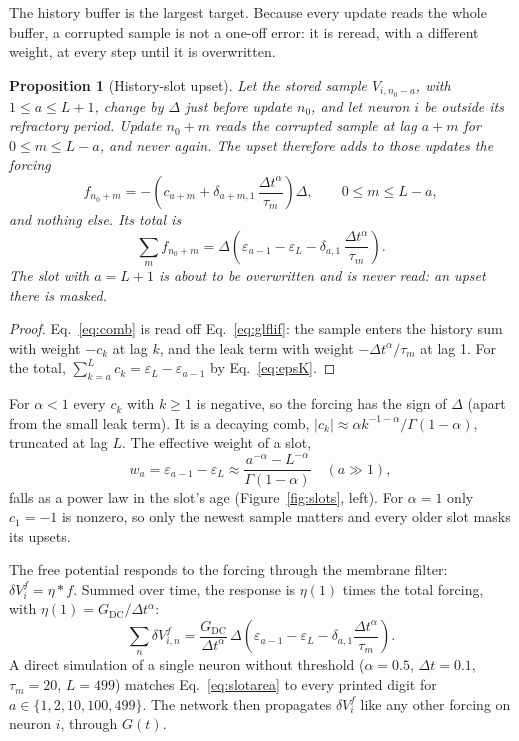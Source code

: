\documentclass[11pt,a4paper]{article}
\newcommand{\dta}{\Delta t^{\alpha}}
\newtheorem{proposition}{Proposition}
\begin{document}
The history buffer is the largest target. Because every update reads the whole buffer, a corrupted sample is not a one-off error: it is reread, with a different weight, at every step until it is overwritten.

\begin{proposition}[History-slot upset]
\label{prop:slot}
Let the stored sample $V_{i,n_0-a}$, with $1 \le a \le L+1$, change by $\Delta$ just before update $n_0$, and let neuron $i$ be outside its refractory period. Update $n_0+m$ reads the corrupted sample at lag $a+m$ for $0 \le m \le L-a$, and never again. The upset therefore adds to those updates the forcing
\begin{equation}
f_{n_0+m} = -\left( c_{a+m} + \delta_{a+m,1}\, \frac{\dta}{\tau_m} \right) \Delta, \qquad 0 \le m \le L-a,
\label{eq:comb}
\end{equation}
and nothing else. Its total is
\begin{equation}
\sum_m f_{n_0+m} = \Delta \left( \varepsilon_{a-1} - \varepsilon_L - \delta_{a,1}\, \frac{\dta}{\tau_m} \right).
\label{eq:slottotal}
\end{equation}
The slot with $a = L+1$ is about to be overwritten and is never read: an upset there is masked.
\end{proposition}
\begin{proof}
Eq.~\eqref{eq:comb} is read off Eq.~\eqref{eq:glflif}: the sample enters the history sum with weight $-c_k$ at lag $k$, and the leak term with weight $-\dta/\tau_m$ at lag 1. For the total, $\sum_{k=a}^{L} c_k = \varepsilon_L - \varepsilon_{a-1}$ by Eq.~\eqref{eq:epsK}.
\end{proof}

For $\alpha < 1$ every $c_k$ with $k \ge 1$ is negative, so the forcing has the sign of $\Delta$ (apart from the small leak term). It is a decaying comb, $|c_k| \approx \alpha k^{-1-\alpha}/\Gamma(1-\alpha)$, truncated at lag $L$. The effective weight of a slot,
\begin{equation}
w_a = \varepsilon_{a-1} - \varepsilon_L \approx \frac{a^{-\alpha} - L^{-\alpha}}{\Gamma(1-\alpha)} \quad (a \gg 1),
\label{eq:wa}
\end{equation}
falls as a power law in the slot's age (Figure~\ref{fig:slots}, left). For $\alpha = 1$ only $c_1 = -1$ is nonzero, so only the newest sample matters and every older slot masks its upsets.

The free potential responds to the forcing through the membrane filter: $\delta V^{f}_i = \eta * f$. Summed over time, the response is $\eta(1)$ times the total forcing, with $\eta(1) = G_{\mathrm{DC}}/\dta$:
\begin{equation}
\sum_n \delta V^{f}_{i,n} = \frac{G_{\mathrm{DC}}}{\dta}\, \Delta \left( \varepsilon_{a-1} - \varepsilon_L - \delta_{a,1}\frac{\dta}{\tau_m} \right).
\label{eq:slotarea}
\end{equation}
A direct simulation of a single neuron without threshold ($\alpha = 0.5$, $\Delta t = 0.1$, $\tau_m = 20$, $L = 499$) matches Eq.~\eqref{eq:slotarea} to every printed digit for $a \in \{1, 2, 10, 100, 499\}$. The network then propagates $\delta V^{f}_i$ like any other forcing on neuron $i$, through $G(t)$.
\end{document}
